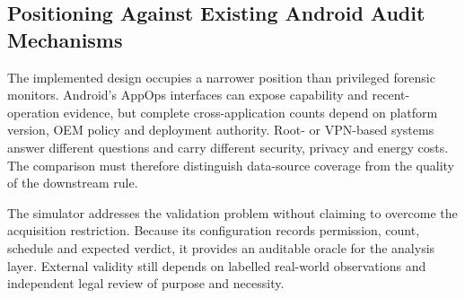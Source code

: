 
\subsection{Positioning Against Existing Android Audit Mechanisms}

The implemented design occupies a narrower position than privileged forensic monitors. Android's AppOps interfaces can expose capability and recent-operation evidence, but complete cross-application counts depend on platform version, OEM policy and deployment authority. Root- or VPN-based systems answer different questions and carry different security, privacy and energy costs. The comparison must therefore distinguish data-source coverage from the quality of the downstream rule.

The simulator addresses the validation problem without claiming to overcome the acquisition restriction. Because its configuration records permission, count, schedule and expected verdict, it provides an auditable oracle for the analysis layer. External validity still depends on labelled real-world observations and independent legal review of purpose and necessity.

